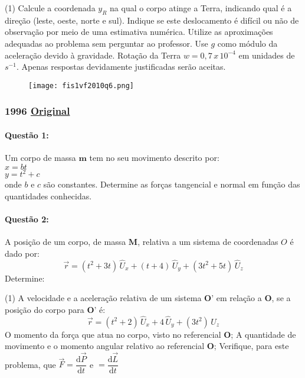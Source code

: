 \documentclass[12pt,a4paper]{article}
\newcommand{\original}[1]{\tiny \href{#1}{Original} \normalsize}
\begin{document}
\begin{tasks}(1)
\task Calcule a coordenada $y_R$ na qual o corpo atinge a Terra, indicando qual é a direção (leste, oeste, norte e sul).
\task Indique se este deslocamento é difícil ou não de observação por meio de uma estimativa numérica. Utilize as aproximações adequadas ao problema sem perguntar ao professor. Use $g$ como módulo da aceleração devido à gravidade. Rotação da Terra $w=0,7\,x\,10^{-4}$ em unidades de $s^{-1}$. Apenas respostas devidamente justificadas serão aceitas.
\end{tasks}

\begin{figure}[ht]
\centering
\texttt{[image: fis1vf2010q6.png]}
\end{figure}

\newpage
\subsubsection{1996 \original{https://drive.google.com/file/d/1wSj5zppODdEwHm49wiTNySOY2bTN64kp/view?usp=sharing}}

\paragraph{Questão 1:}
Um corpo de massa $\textbf{m}$ tem no seu movimento descrito por:
\\
$x=bt$\\
$y=t^2+c$\\
onde $b$ e $c$ são constantes. Determine as forças tangencial e normal em função das quantidades conhecidas.

\paragraph{Questão 2:}
A posição de um corpo, de massa $\textbf{M}$, relativa a um sistema de coordenadas $O$ é dado por:
$$\overrightarrow{r}=(t^2+3t)\,\widehat{U}_x+(t+4)\,\widehat{U}_y+(3t^2+5t)\,\widehat{U}_z$$
Determine:

\begin{tasks}(1)
\task A velocidade e a aceleração relativa de um sistema $\textbf{O'}$ em relação a $\textbf{O}$, se a posição do corpo para $\textbf{O'}$ é:\\
$$\overrightarrow{r}=(t^2+2)\,\widehat{U}_x+4\,\widehat{U}_y+(3t^2)\,\widehat{U}_z$$
\task O momento da força que atua no corpo, visto no referencial $\textbf{O}$;
\task A quantidade de movimento e o momento angular relativo ao referencial $\textbf{O}$;
\task Verifique, para este problema, que    $\overrightarrow{F}=\dfrac{\mathrm{d}\overrightarrow{P} }{\mathrm{d} t}$ e $=\dfrac{\mathrm{d}\overrightarrow{L} }{\mathrm{d} t}$
\end{tasks}
\end{document}
